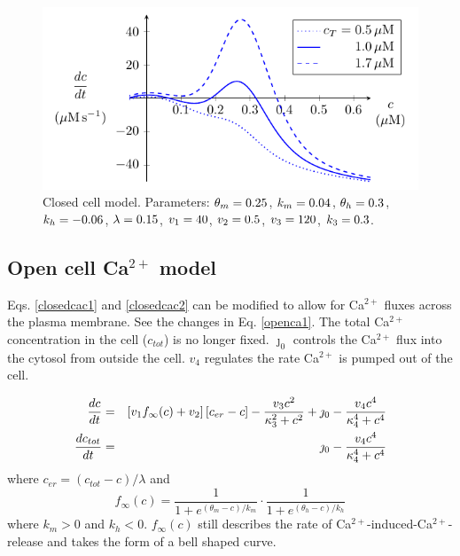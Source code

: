 \documentclass[12pt]{article}
\def\ca{Ca$^{2+}$\xspace}
\def\ctot{c_{tot}}
\def\cer{c_{er}}
\def\finf{f_\infty}
\def\thetam{\theta_m}
\def\km{k_m}
\def\thetah{\theta_h}
\def\kh{k_h}
\begin{document}
\begin{figure}[h!]
\centering
\includegraphics[]{Fig03CalciumClosedCellModel.pdf}
\caption{Closed cell model. Parameters: 
$\thetam=\figthetam$,
$\km=\figkm$,
$\thetah=\figthetah$,
$\kh=\figkh$,
$\lambda=0.15$,
$v_1 = 40$,
$v_2 = 0.5$,
$v_3 = 120$, 
$k_3 = 0.3$.
}
\label{CalciumClosedCell}
\end{figure}
 
\clearpage
\subsection*{Open cell Ca$^{2+}$ model} 

Eqs. \ref{closedcac1} and \ref{closedcac2} can be modified to allow for \ca fluxes across the plasma membrane. See the changes in Eq. \ref{openca1}. The total \ca concentration in the cell ($\ctot$) is no longer fixed. $\jmath_0$ controls the \ca flux into the cytosol from outside the cell. $v_4$ regulates the rate \ca is pumped out of the cell. %

\begin{eqnarray}
  \ddt{c} &=&  \left[ v_1 \finf(c) + v_2 \right] [\cer - c ] - \frac{v_3 c^2 }{\kappa_3^2 + c^2} + \jmath_0    -  \frac{v_4 c^4}{\kappa_4^4+c^4} \label{openca1} \\
 \ddt{\ctot} &=& \jmath_0  -   \frac{v_4 c^4}{\kappa_4^4+c^4} \label{openca2}
\end{eqnarray}
where  $\cer = (\ctot-c)/\lambda$ and 
\begin{equation}
\finf(c) =  \frac{1}{1+e^{(\thetam-c)/\km}} \cdot  \frac{1}{1+e^{(\thetah-c)/\kh}}  \nonumber 
\end{equation}
where $\km>0$ and $\kh<0$. $f_\infty(c)$ still describes the rate of \ca-induced-\ca-release and takes the form of a bell shaped curve. 
\end{document}
